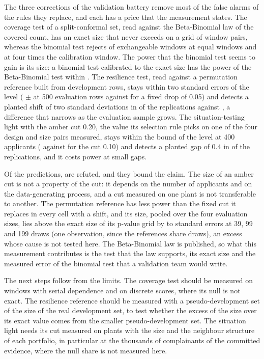 The three corrections of the validation battery remove most of the false alarms of the rules they replace, and each has a price that the measurement states. The coverage test of a split-conformal set, read against the Beta-Binomial law of the covered count, has an exact size that never exceeds \CovBBMaxExact{} on a grid of \CovGridCells{} window pairs, whereas the binomial test rejects \CovSinBinB{} of exchangeable windows at equal windows and \CovSinBinC{} at four times the calibration window. The power that the binomial test seems to gain is its size: a binomial test calibrated to the exact size has the power of the Beta-Binomial test within \ExPowGapMax{}. The resilience test, read against a permutation reference built from development rows, stays within two standard errors of the level (\ShRatePermCZ{} $\pm$ \ShSePermCZ{} at 500 evaluation rows against \ShRateFixedFiveCZ{} for a fixed drop of 0.05) and detects a planted shift of two standard deviations in \ShRatePermCT{} of the replications against \ShRateFixedFiveCT{}, a difference that narrows as the evaluation sample grows. The situation-testing light with the amber cut 0.20, the value its selection rule picks on one of the four design and size pairs measured, stays within the bound of the level at 400 applicants (\SiRateCutTwentySmallZ{} against \SiRateCutTenSmallZ{} for the cut 0.10) and detects a planted gap of 0.4 in \SiRateCutTwentySmallC{} of the replications, and it costs power at small gaps.

Of the \HypTotal{} predictions, \HypRefuted{} are refuted, and they bound the claim. The size of an amber cut is not a property of the cut: it depends on the number of applicants and on the data-generating process, and a cut measured on one plant is not transferable to another. The permutation reference has less power than the fixed cut it replaces in every cell with a shift, and its size, pooled over the four evaluation sizes, lies above the exact size of its p-value grid by \ShPermExcessZMin{} to \ShPermExcessZMax{} standard errors at 39, 99 and 199 draws (one observation, since the references share draws), an excess whose cause is not tested here. The Beta-Binomial law is published, so what this measurement contributes is the test that the law supports, its exact size and the measured error of the binomial test that a validation team would write.

The next steps follow from the limits. The coverage test should be measured on windows with serial dependence and on discrete scores, where its null is not exact. The resilience reference should be measured with a pseudo-development set of the size of the real development set, to test whether the excess of the size over its exact value comes from the smaller pseudo-development set. The situation light needs its cut measured on plants with the size and the neighbour structure of each portfolio, in particular at the thousands of complainants of the committed evidence, where the null share is not measured here.
